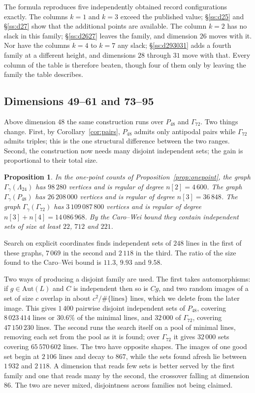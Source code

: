 \documentclass[11pt]{amsart}
\newtheorem{proposition}[theorem]{Proposition}
\theoremstyle{remark}
\newcommand{\Leech}{\Lambda_{24}}
\newcommand{\Pff}{P_{48}}
\newcommand{\Gsz}{\Gamma_{72}}
\begin{document}
The formula reproduces five independently obtained record configurations exactly.
The columns $k=1$ and $k=3$ exceed the published value; \S\ref{ss:d25} and
\S\ref{ss:d27} show that the additional points are available. The column $k=2$
has no slack in this family; \S\ref{ss:d2627} leaves the family, and dimension
$26$ moves with it. Nor have the columns $k=4$ to $k=7$ any slack;
\S\ref{ss:d293031} adds a fourth family at a different height, and dimensions
$28$ through $31$ move with that. Every column of the table is therefore beaten,
though four of them only by leaving the family the table describes.

\subsection{Dimensions 49--61 and 73--95}\label{ss:big}

Above dimension $48$ the same construction runs over $\Pff$ and $\Gsz$. Two
things change. First, by Corollary~\ref{cor:pairs}, $\Pff$ admits only antipodal
pairs while $\Gsz$ admits triples; this is the one structural difference between
the two ranges. Second, the construction now needs many disjoint independent
sets; the gain is proportional to their total size.

\begin{proposition}\label{prop:classes}
In the one-point counts of Proposition~\ref{prop:onepoint}, the graph
$\Gamma_\gamma(\Leech)$ has $98\,280$ vertices and is regular of degree
$n[2]=4\,600$. The graph $\Gamma_\gamma(\Pff)$ has $26\,208\,000$ vertices and is
regular of degree $n[3]=36\,848$. The graph $\Gamma_\gamma(\Gsz)$ has
$3\,109\,087\,800$ vertices and is regular of degree $n[3]+n[4]=14\,086\,968$. By
the Caro--Wei bound they contain independent sets of size at least $22$, $712$
and $221$.
\end{proposition}

Search on explicit coordinates finds independent sets of $248$ lines in the
first of these graphs, $7\,069$ in the second and $2\,118$ in the third. The
ratio of the size found to the Caro--Wei bound is $11.3$, $9.93$ and $9.58$.

Two ways of producing a disjoint family are used. The first takes automorphisms:
if $g\in\mathrm{Aut}(L)$ and $C$ is independent then so is $Cg$, and two random
images of a set of size $c$ overlap in about $c^2/\#\{\text{lines}\}$ lines,
which we delete from the later image. This gives $1\,400$ pairwise disjoint
independent sets of $\Pff$, covering $8\,023\,414$ lines or $30.6\%$ of the
minimal lines, and $32\,000$ of $\Gsz$, covering $47\,150\,230$ lines. The second
runs the search itself on a pool of minimal lines, removing each set from the
pool as it is found; over $\Gsz$ it gives $32\,000$ sets covering
$65\,570\,602$ lines. The two have opposite shapes. The images of one good set
begin at $2\,106$ lines and decay to $867$, while the sets found afresh lie
between $1\,932$ and $2\,118$. A dimension that reads few sets is better served
by the first family and one that reads many by the second, the crossover falling
at dimension $86$. The two are never mixed, disjointness across families not
being claimed.
\end{document}
